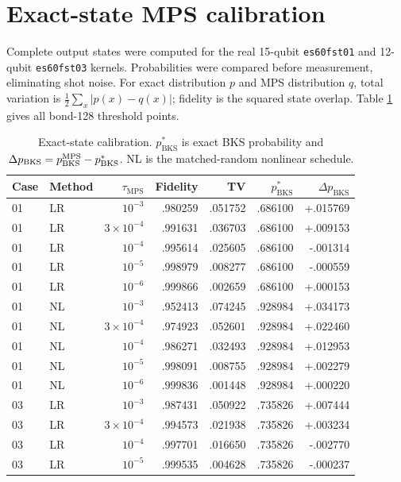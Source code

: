 \documentclass[10pt]{article}
\newcommand{\BKS}{\mathrm{BKS}}
\newcommand{\tauMPS}{\tau_{\mathrm{MPS}}}
\begin{document}
\section{Exact-state MPS calibration}

Complete output states were computed for the real 15-qubit
\texttt{es60fst01} and 12-qubit \texttt{es60fst03} kernels. Probabilities were
compared before measurement, eliminating shot noise. For exact distribution
$p$ and MPS distribution $q$, total variation is
$\tfrac12\sum_x|p(x)-q(x)|$; fidelity is the squared state overlap. Table
\ref{tab:exact} gives all bond-128 threshold points.

\begin{table}[h]
\centering
\caption{Exact-state calibration. $p^*_{\BKS}$ is exact BKS probability and
$\Delta p_{\BKS}=p^{\rm MPS}_{\BKS}-p^*_{\BKS}$. NL is the matched-random
nonlinear schedule.}
\label{tab:exact}
\small
\begin{tabular}{llrrrrr}
\toprule
Case & Method & $\tauMPS$ & Fidelity & TV & $p^*_{\BKS}$ & $\Delta p_{\BKS}$ \\
\midrule
01 & LR & $10^{-3}$ & .980259 & .051752 & .686100 & +.015769 \\
01 & LR & $3\times10^{-4}$ & .991631 & .036703 & .686100 & +.009153 \\
01 & LR & $10^{-4}$ & .995614 & .025605 & .686100 & -.001314 \\
01 & LR & $10^{-5}$ & .998979 & .008277 & .686100 & -.000559 \\
01 & LR & $10^{-6}$ & .999866 & .002659 & .686100 & +.000153 \\
01 & NL & $10^{-3}$ & .952413 & .074245 & .928984 & +.034173 \\
01 & NL & $3\times10^{-4}$ & .974923 & .052601 & .928984 & +.022460 \\
01 & NL & $10^{-4}$ & .986271 & .032493 & .928984 & +.012953 \\
01 & NL & $10^{-5}$ & .998091 & .008755 & .928984 & +.002279 \\
01 & NL & $10^{-6}$ & .999836 & .001448 & .928984 & +.000220 \\
\midrule
03 & LR & $10^{-3}$ & .987431 & .050922 & .735826 & +.007444 \\
03 & LR & $3\times10^{-4}$ & .994573 & .021938 & .735826 & +.003234 \\
03 & LR & $10^{-4}$ & .997701 & .016650 & .735826 & -.002770 \\
03 & LR & $10^{-5}$ & .999535 & .004628 & .735826 & -.000237 \\

\end{tabular}
\end{table}
\end{document}
